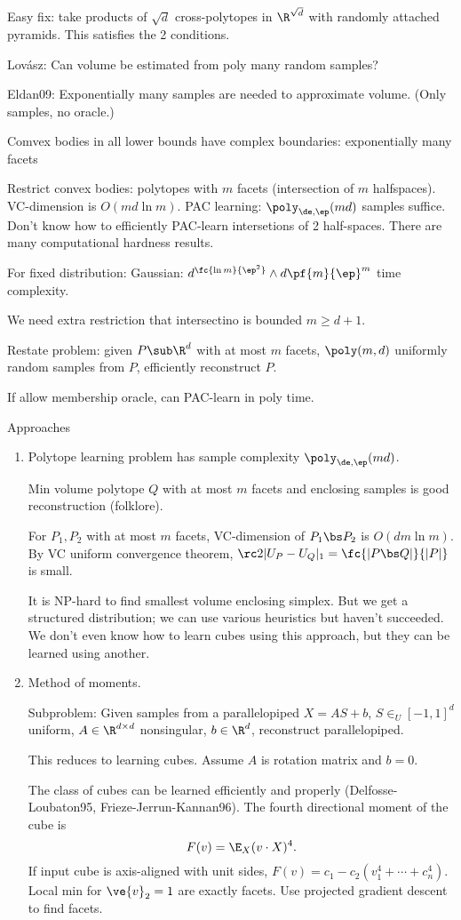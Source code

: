 Easy fix: take products of $\sqrt d$ cross-polytopes in $\R^{\sqrt d}$ with randomly attached pyramids. 
This satisfies the 2 conditions.

Lov\'asz: Can volume be estimated from poly many random samples? 

Eldan09: Exponentially many samples are needed to approximate volume. (Only samples, no oracle.)

Comvex bodies in all lower bounds have complex boundaries: exponentially many facets

Restrict convex bodies: polytopes with $m$ facets (intersection of $m$ halfspaces). VC-dimension is $O(md\ln m)$. PAC learning: $\poly_{\de,\ep}(md)$ samples suffice. Don't know how to efficiently PAC-learn intersetions of 2 half-spaces. There are many computational hardness results. 

For fixed distribution: Gaussian: $d^{\fc{\ln m}{\ep^2}}\wedge d\pf{m}{\ep}^m$ time complexity.

We need extra restriction that intersectino is bounded $m\ge d+1$. 

Restate problem: given $P\sub \R^d$ with at most $m$ facets, $\poly(m,d)$ uniformly random samples from $P$, efficiently reconstruct $P$.

If allow membership oracle, can PAC-learn  in poly time.


Approaches
\begin{enumerate}
\item
Polytope learning problem has sample complexity $\poly_{\de, \ep}(md)$. 

Min volume polytope $Q$ with at most $m$ facets and enclosing samples is good reconstruction (folklore).

For $P_1,P_2$ with at most $m$ facets, VC-dimension of $P_1\bs P_2$ is $O(dm\ln m)$. By VC uniform convergence theorem, $\rc 2|U_P-U_Q|_1= \fc{|P\bs Q|}{|P|}$ is small. 

It is NP-hard to find smallest volume enclosing simplex. But we get a structured distribution; we can use various heuristics but haven't succeeded. We don't even know how to learn cubes using this approach, but they can be learned using another.
\item
Method of moments.

Subproblem: Given samples from a parallelopiped $X=AS+b$, $S\in_U [-1,1]^d$ uniform, $A\in \R^{d\times d}$ nonsingular, $b\in \R^d$, reconstruct parallelopiped.

This reduces to learning cubes. Assume $A$ is rotation matrix and $b=0$.

The class of cubes can be learned efficiently and properly (Delfosse-Loubaton95, Frieze-Jerrun-Kannan96). The fourth directional moment of the cube is 
$$F(v) = \E_X (v\cdot X)^4.$$
If input cube is axis-aligned with unit sides, $F(v) = c_1-c_2(v_1^4+\cdots + c_n^4)$.
Local min for $\ve{v}_2=1$ are exactly facets.
Use projected gradient descent to find facets. 
\end{enumerate}

